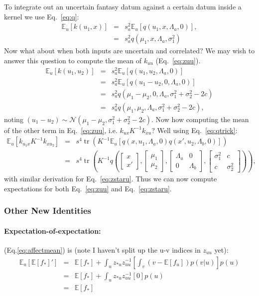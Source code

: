 \documentclass[a4paper,10pt]{article}
\newcommand{\N}{\mathcal{N}}
\newcommand{\inv}{^{-1}}
\newcommand{\E}{\mathbb{E}}
\newcommand{\tr}{\operatorname{tr}}
\newcommand{\nnn}{\nonumber \\}
\newcommand{\vv}[2]{\begin{bmatrix} #1 \\ #2 \end{bmatrix}} %
\begin{document}
To integrate out an uncertain fantasy datum against a certain datum
inside a kernel
we use Eq.~\ref{eq:q}:
\begin{eqnarray}
 \E_{u}[k(u_1,x)]
 & = & s_a^2 \E_{u}[ q(u_1,x,\Lambda_a,0)],\nnn
 & = & s_a^2 q(\mu_1,x,\Lambda_a,\sigma^2_1)
\end{eqnarray}
Now what about when both inputs are uncertain and correlated?
We may wish to answer this question to compute the mean of $k_{uu}$ (Eq.~\ref{eq:zuu}).
\begin{eqnarray}
 \E_{u}[k(u_1,u_2)]
 & = & s_a^2 \E_{u}[ q(u_1,u_2,\Lambda_a,0)] \nnn
 & = & s_a^2 \E_{u}[ q(u_1-u_2,0,\Lambda_a,0)] \nnn
 & = & s_a^2 q(\mu_1-\mu_2,0,\Lambda_a,\sigma^2_1 + \sigma^2_2 -2c) \nnn
 & = & s_a^2 q(\mu_1,\mu_2,\Lambda_a,\sigma^2_1 + \sigma^2_2 -2c),
\end{eqnarray}
noting $(u_1-u_2)\sim\N(\mu_1-\mu_2,\sigma^2_1 + \sigma^2_2 -2c)$.
%
Now how computing the mean of the other term in Eq.~\ref{eq:zuu}, i.e. $k_{ux}K\inv k_{xu}$?
Well using Eq.~\ref{eq:qtrick}:
\begin{eqnarray}
 \E_u[k_{u_1x}K\inv k_{xu_2}]
 & = & s^4\tr\left( K\inv \E_u\left[q(x,u_1,\Lambda_a,0)q(x',u_2,\Lambda_b,0)\right]\right) \nnn
 & = & s^4\tr\left( K\inv q\left(\vv{x}{x'},\vv{\mu_1}{\mu_2},
 \begin{bmatrix} \Lambda_a & 0 \\ 0 & \Lambda_b \end{bmatrix},
 \begin{bmatrix} \sigma^2_1 & c \\ c & \sigma^2_2 \end{bmatrix}\right)\right),
\end{eqnarray}
with similar derivation for Eq.~\ref{eq:zstaru}.
Thus we can now compute expectations for both Eq.~\ref{eq:zuu} and Eq.~\ref{eq:zstaru}.

\subsubsection{Other New Identities}


\paragraph{Expectation-of-expectation:} (Eq.\ref{eq:affectmean}) is (note I haven't split up the u-v indices in $z_{uu}$ yet):
\begin{eqnarray}
 \E_u[\E[f_*]'] %
                    & = & \E[f_*] + \int_u z_{*u}z_{uu}\inv  \left[ \int_v (v - \E[f_u]) p(v|u) \right]  p(u) \nnn
                    & = & \E[f_*] + \int_u z_{*u}z_{uu}\inv  \left[0\right]  p(u) \nnn
                    & = & \E[f_*]
\end{eqnarray}
\end{document}
